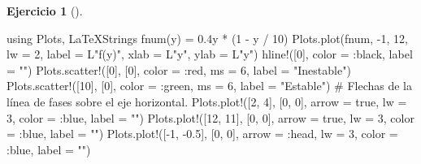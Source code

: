 \documentclass[
  spanish,
  a4paper,
]{scrreport}
\newenvironment{Shaded}{\begin{snugshade}}{\end{snugshade}}
\newcommand{\BuiltInTok}[1]{\textcolor[rgb]{0.00,0.23,0.31}{#1}}
\newcommand{\CommentTok}[1]{\textcolor[rgb]{0.37,0.37,0.37}{#1}}
\newcommand{\ConstantTok}[1]{\textcolor[rgb]{0.56,0.35,0.01}{#1}}
\newcommand{\FloatTok}[1]{\textcolor[rgb]{0.68,0.00,0.00}{#1}}
\newcommand{\FunctionTok}[1]{\textcolor[rgb]{0.28,0.35,0.67}{#1}}
\newcommand{\ImportTok}[1]{\textcolor[rgb]{0.00,0.46,0.62}{#1}}
\newcommand{\NormalTok}[1]{\textcolor[rgb]{0.00,0.23,0.31}{#1}}
\newcommand{\OperatorTok}[1]{\textcolor[rgb]{0.37,0.37,0.37}{#1}}
\newcommand{\StringTok}[1]{\textcolor[rgb]{0.13,0.47,0.30}{#1}}
\theoremstyle{definition}
\newtheorem{exercise}{Ejercicio}[chapter]
\theoremstyle{remark}
\begin{document}
\begin{exercise}[]
\begin{enumerate}
\begin{tcolorbox}
\begin{Shaded}
\begin{Highlighting}[]
\ImportTok{using} \BuiltInTok{Plots}\NormalTok{, }\BuiltInTok{LaTeXStrings}
\FunctionTok{fnum}\NormalTok{(y) }\OperatorTok{=} \FloatTok{0.4}\NormalTok{y }\OperatorTok{*}\NormalTok{ (}\FloatTok{1} \OperatorTok{{-}}\NormalTok{ y }\OperatorTok{/} \FloatTok{10}\NormalTok{)}
\NormalTok{Plots.}\FunctionTok{plot}\NormalTok{(fnum, }\OperatorTok{{-}}\FloatTok{1}\NormalTok{, }\FloatTok{12}\NormalTok{, lw }\OperatorTok{=} \FloatTok{2}\NormalTok{, label }\OperatorTok{=}\NormalTok{ L}\StringTok{"f(y)"}\NormalTok{, xlab }\OperatorTok{=}\NormalTok{ L}\StringTok{"y"}\NormalTok{, ylab }\OperatorTok{=}\NormalTok{ L}\StringTok{"y\textquotesingle{}"}\NormalTok{)}
\FunctionTok{hline!}\NormalTok{([}\FloatTok{0}\NormalTok{], color }\OperatorTok{=} \OperatorTok{:}\NormalTok{black, label }\OperatorTok{=} \StringTok{""}\NormalTok{)}
\NormalTok{Plots.}\FunctionTok{scatter!}\NormalTok{([}\FloatTok{0}\NormalTok{], [}\FloatTok{0}\NormalTok{], color }\OperatorTok{=} \OperatorTok{:}\NormalTok{red, ms }\OperatorTok{=} \FloatTok{6}\NormalTok{, label }\OperatorTok{=} \StringTok{"Inestable"}\NormalTok{)}
\NormalTok{Plots.}\FunctionTok{scatter!}\NormalTok{([}\FloatTok{10}\NormalTok{], [}\FloatTok{0}\NormalTok{], color }\OperatorTok{=} \OperatorTok{:}\NormalTok{green, ms }\OperatorTok{=} \FloatTok{6}\NormalTok{, label }\OperatorTok{=} \StringTok{"Estable"}\NormalTok{)}
\CommentTok{\# Flechas de la línea de fases sobre el eje horizontal.}
\NormalTok{Plots.}\FunctionTok{plot!}\NormalTok{([}\FloatTok{2}\NormalTok{, }\FloatTok{4}\NormalTok{], [}\FloatTok{0}\NormalTok{, }\FloatTok{0}\NormalTok{], arrow }\OperatorTok{=} \ConstantTok{true}\NormalTok{, lw }\OperatorTok{=} \FloatTok{3}\NormalTok{, color }\OperatorTok{=} \OperatorTok{:}\NormalTok{blue, label }\OperatorTok{=} \StringTok{""}\NormalTok{)}
\NormalTok{Plots.}\FunctionTok{plot!}\NormalTok{([}\FloatTok{12}\NormalTok{, }\FloatTok{11}\NormalTok{], [}\FloatTok{0}\NormalTok{, }\FloatTok{0}\NormalTok{], arrow }\OperatorTok{=} \ConstantTok{true}\NormalTok{, lw }\OperatorTok{=} \FloatTok{3}\NormalTok{, color }\OperatorTok{=} \OperatorTok{:}\NormalTok{blue, label }\OperatorTok{=} \StringTok{""}\NormalTok{)}
\NormalTok{Plots.}\FunctionTok{plot!}\NormalTok{([}\OperatorTok{{-}}\FloatTok{1}\NormalTok{, }\OperatorTok{{-}}\FloatTok{0.5}\NormalTok{], [}\FloatTok{0}\NormalTok{, }\FloatTok{0}\NormalTok{], arrow }\OperatorTok{=} \OperatorTok{:}\NormalTok{head, lw }\OperatorTok{=} \FloatTok{3}\NormalTok{, color }\OperatorTok{=} \OperatorTok{:}\NormalTok{blue, label }\OperatorTok{=} \StringTok{""}\NormalTok{)}
\end{Highlighting}
\end{Shaded}


\end{tcolorbox}
\end{enumerate}
\end{exercise}
\end{document}
